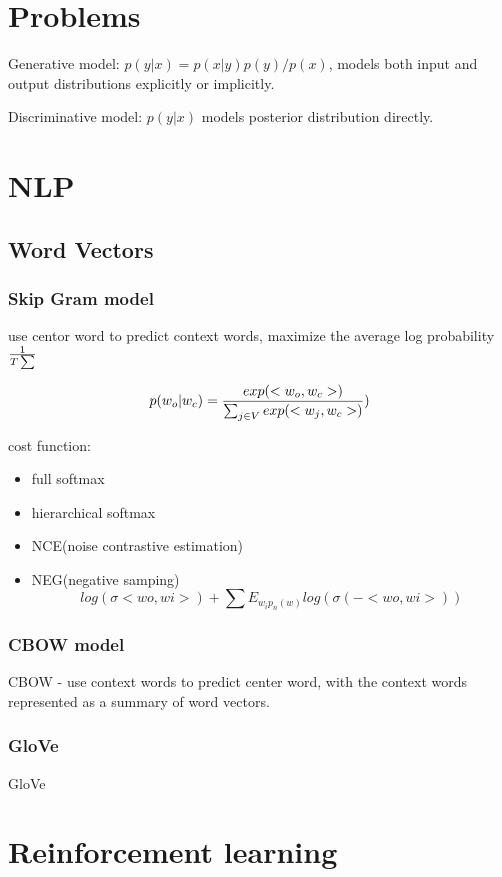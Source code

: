 \documentclass[10pt,a4paper]{book}
\begin{document}
\chapter{Problems}

Generative model: $p(y|x) = p(x|y)p(y)/p(x)$, models both input and output distributions explicitly or implicitly.


Discriminative model: $p(y|x)$
models posterior distribution directly.


\chapter{NLP}

\section{Word Vectors}

\subsection{Skip Gram model}
use centor word to predict context words, maximize the average log probability
$1\over T \sum$

$$ p(w_o | w_c) = {exp(<w_o,w_c>) \over \sum_{j \in V} exp(<w_j,w_c>) })$$

cost function:
\begin{itemize}
	\item full softmax
	\item hierarchical softmax
	\item NCE(noise contrastive estimation)
	\item NEG(negative samping)
	$$log(\sigma <wo,wi>) + \sum E_{w_i  p_n(w)} {log(\sigma (- <wo,wi>))}$$
\end{itemize}


\subsection{CBOW model}

CBOW - use context words to predict center word, with the context words represented as a summary of word vectors.

\subsection{GloVe}
GloVe

\chapter{Reinforcement learning}
\end{document}
